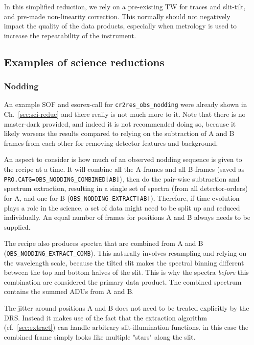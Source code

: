 In this simplified reduction, we rely on a pre-existing TW for traces and slit-tilt, and pre-made non-linearity correction. This normally should not negatively impact the quality of the data products, especially when metrology is used to increase the repeatability of the instrument.

\subsection{Examples of science reductions}

\subsubsection{Nodding}
\label{sec:nodding}
An example SOF and esorex-call for \verb!cr2res_obs_nodding! were already shown
in Ch.~\ref{sec:sci-reduc} and there really is not much more to it. Note that
there is no master-dark provided, and indeed it is not recommended doing so,
because it likely worsens the results compared to relying on the subtraction of
A and B frames from each other for removing detector features and background.

An aspect to consider is how much of an observed nodding sequence is given to
the recipe at a time. It will combine all the A-frames and all B-frames (saved
as \verb!PRO.CATG=OBS_NODDING_COMBINED[AB]!), then do the pair-wise subtraction
and spectrum extraction, resulting in a single set of spectra (from all
detector-orders) for A, and one for B (\verb!OBS_NODDING_EXTRACT[AB]!).
Therefore, if time-evolution plays a role in the science, a set of data might
need to be split up and reduced individually. An equal number of frames for
positions A and B always needs to be supplied.

The recipe also produces spectra that are combined from A and B
(\verb!OBS_NODDING_EXTRACT_COMB!). This naturally involves resampling and
relying on the wavelength scale, because the tilted slit makes the spectral
binning different between the top and bottom halves of the slit. This is why the
spectra \emph{before} this combination are considered the primary data product.
The combined spectrum contains the summed ADUs from A and B.

The jitter around positions A and B does not need to be treated explicitly by
the DRS. Instead it makes use of the fact that the extraction algorithm
(cf.~\ref{sec:extract}) can handle arbitrary slit-illumination functions, in
this case the combined frame simply looks like multiple "stars" along the slit.

